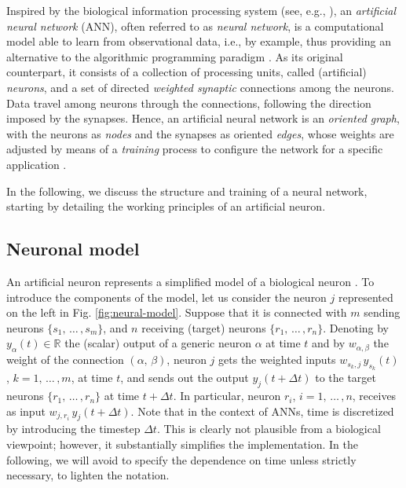 \documentclass[longtitle]{elsarticle}
\numberwithin{equation}{section}
\theoremstyle{theorem}
\theoremstyle{definition}
\theoremstyle{remark}
\theoremstyle{proposition}
\numberwithin{figure}{section}
\begin{document}
		Inspired by the biological information processing system (see, e.g., \cite{Hay05, Kri07}), an \emph{artificial neural network} (ANN), often referred to as \emph{neural network}, is a computational model able to learn from observational data, i.e., by example, thus providing an alternative to the algorithmic programming paradigm \cite{Nie15}. As its original counterpart, it consists of a collection of processing units, called (artificial) \emph{neurons}, and a set of directed \emph{weighted synaptic} connections among the neurons. Data travel among neurons through the connections, following the direction imposed by the synapses. Hence, an artificial neural network is an \emph{oriented graph}, with the neurons as \emph{nodes} and the synapses as oriented \emph{edges}, whose weights are adjusted by means of a \emph{training} process to configure the network for a specific application \cite{SD13}. 
		
		In the following, we discuss the structure and training of a neural network, starting by detailing the working principles of an artificial neuron.  
		
				
											
	\subsection{Neuronal model}
	\label{section:Neuronal model}
	
		An artificial neuron represents a simplified model of a biological neuron \cite{Kri07}. To introduce the components of the model, let us consider the neuron $j$ represented on the left in Fig. \ref{fig:neural-model}. Suppose that it is connected with $m$ sending neurons $\big\lbrace s_1, \, \ldots \, , s_m \big\rbrace$, and $n$ receiving (target) neurons $\big\lbrace r_1, \, \ldots \, , r_n \big\rbrace$. Denoting by $y_{\alpha}(t) \in \mathbb{R}$ the (scalar) output of a generic neuron $\alpha$ at time $t$ and by $w_{\alpha,\beta}$ the weight of the connection $(\alpha, \, \beta)$, neuron $j$ gets the weighted inputs $w_{s_k,j} \, y_{s_k}(t)$, $k = 1, \, \ldots \, , m$, at time $t$, and sends out the output $y_j(t + \Delta t)$ to the target neurons $\big\lbrace r_1, \, \ldots \, , r_n \big\rbrace$ at time $t + \Delta t$. In particular, neuron $r_i$, $i = 1, \, \ldots \, , n$, receives as input $w_{j,r_i} \, y_j(t + \Delta t)$. Note that in the context of ANNs, time is discretized by introducing the timestep $\Delta t$. This is clearly not plausible from a biological viewpoint; however, it substantially simplifies the implementation. In the following, we will avoid to specify the dependence on time unless strictly necessary, to lighten the notation.
		
\end{document}
